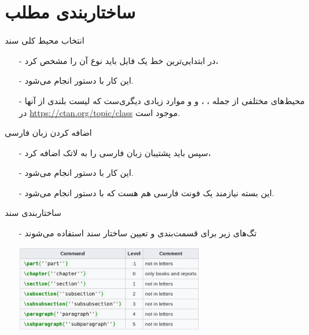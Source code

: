 \section{ساختاربندی مطلب}
\begin{frame}{انتخاب محیط کلی سند}
\begin{itemize}\itemr
\item[-] 
در ابتدایی‌ترین خط یک فایل 
باید نوع آن را مشخص کرد،

\item[-]
این کار با دستور 
انجام می‌شود.

\item[-]
محیط‌های مختلفی از جمله
،
،
 و
و موارد زیادی دیگری‌ست که لیست بلندی از آنها در 
\url{https://ctan.org/topic/class}
موجود است.
\end{itemize}
\end{frame}

\begin{frame}{اضافه کردن زبان فارسی}
\begin{itemize}\itemr
\item[-] 
سپس باید پشتیبان زبان فارسی را به لاتک اضافه کرد،

\item[-]
این کار با دستور 
انجام می‌شود.

\item[-]
این بسته نیازمند یک فونت فارسی هم هست که با دستور 
انجام می‌شود.
\end{itemize}
\end{frame}

\begin{frame}{ساختاربندی سند}\label{parts-chapters}
\begin{itemize}\itemr
\item[-]
تگ‌های زیر برای قسمت‌بندی و تعیین ساختار سند استفاده می‌شوند

\begin{center}
\includegraphics[width=0.63\textwidth, height=0.53\textheight]{docs/images/sections} 
\end{center}
\end{itemize}
\end{frame}

